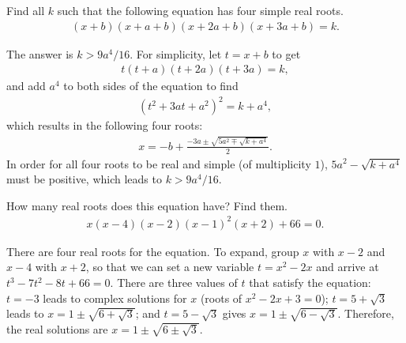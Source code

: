 \documentclass[12pt,a4paper]{memoir}
\theoremstyle{definition}
\begin{document}
\begin{tcolorbox}
	\begin{question}
		Find all $k$ such that the following equation has four simple real roots.
		\begin{align*}
			(x+b)(x+a+b)(x+2a+b)(x+3a+b)=k.
		\end{align*}
	\end{question}
\end{tcolorbox}

\begin{solution}[name=Solution by Parviz Shahriari]
	The answer is $k > 9a^4/16$. For simplicity, let $t=x+b$ to get
	\begin{align*}
		t(t+a)(t+2a)(t+3a)=k,
	\end{align*}
	and add $a^4$ to both sides of the equation to find
	\begin{align*}
		(t^2+3at+a^2)^2 = k+a^4,
	\end{align*}
	which results in the following four roots:
	\begin{align*}
		x = -b + \frac{-3a \pm \sqrt{5a^2 \mp \sqrt{k+a^4}}}{2}.
	\end{align*}
	In order for all four roots to be real and simple (of multiplicity $1$), $5a^2 - \sqrt{k+a^4}$ must be positive, which leads to $k > 9a^4/16$.
\end{solution}



\begin{tcolorbox}
	\begin{question}
		How many real roots does this equation have? Find them.
		\begin{align*}
			x(x-4)(x-2)(x-1)^2(x+2)+66=0.
		\end{align*}
	\end{question}
\end{tcolorbox}

\begin{solution}[name=Solution by Parviz Shahriari]
	There are four real roots for the equation. To expand, group $x$ with $x-2$ and $x-4$ with $x+2$, so that we can set a new variable $t=x^2-2x$ and arrive at $t^3-7t^2-8t+66=0$. There are three values of $t$ that satisfy the equation: $t=-3$ leads to complex solutions for $x$ (roots of $x^2-2x+3=0$); $t=5 + \sqrt 3$ leads to $x=1 \pm \sqrt{6+\sqrt{3}}$; and $t=5 - \sqrt 3$ gives $x=1 \pm \sqrt{6-\sqrt{3}}$. Therefore, the real solutions are  $x=1 \pm \sqrt{6 \pm \sqrt{3}}$.
\end{solution}
\end{document}
